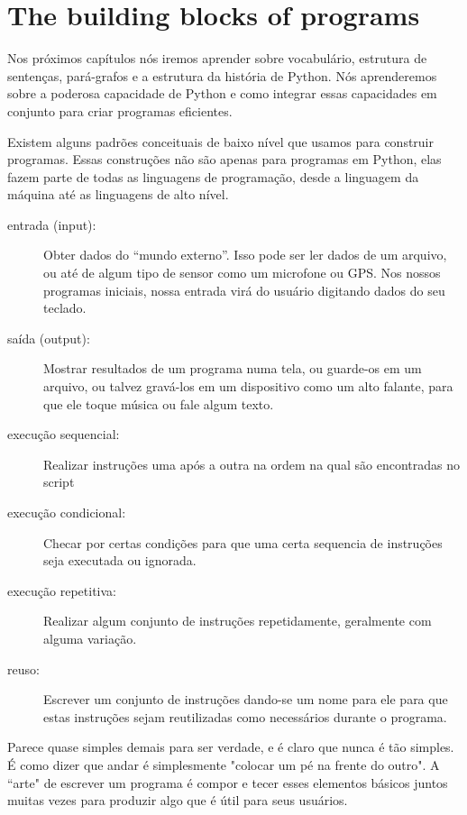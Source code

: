 \section{The building blocks of programs} %

Nos próximos capítulos nós iremos aprender sobre vocabulário, estrutura de sentenças, pará-grafos e a estrutura da história de Python. Nós aprenderemos sobre a poderosa capacidade de Python e como integrar essas capacidades em conjunto para criar programas eficientes. 

Existem alguns padrões conceituais de baixo nível que usamos para construir programas. Essas construções não são apenas para programas em Python, elas fazem parte de todas as linguagens de programação, desde a linguagem da máquina até as linguagens de alto nível.   

\begin{description}

\item[entrada (input):] Obter dados do ``mundo externo''. Isso pode ser ler dados de um arquivo, ou até de algum tipo de sensor como um microfone ou GPS. Nos nossos programas iniciais, nossa entrada virá do usuário digitando dados do seu teclado.
\item[saída (output):] Mostrar  resultados de um programa numa tela, ou guarde-os em um arquivo, ou talvez gravá-los em um dispositivo como um alto falante, para que ele toque música ou fale algum texto.
\item[execução sequencial:] Realizar instruções uma após a outra na ordem na qual são encontradas no script
\item[execução condicional:] Checar por certas condições para que uma certa sequencia de instruções seja executada ou ignorada.
\item[execução repetitiva:] Realizar algum conjunto de instruções repetidamente, geralmente com alguma variação. 
\item[reuso:] Escrever um conjunto de instruções dando-se um nome para ele para que estas instruções sejam reutilizadas como necessários durante o programa.

\end{description}

Parece quase simples demais para ser verdade, e é claro que nunca é tão simples. É como dizer que andar é simplesmente "colocar um pé na frente do outro". A ``arte" de escrever um programa é compor e tecer esses elementos básicos juntos muitas vezes para produzir algo que é útil para seus usuários.

